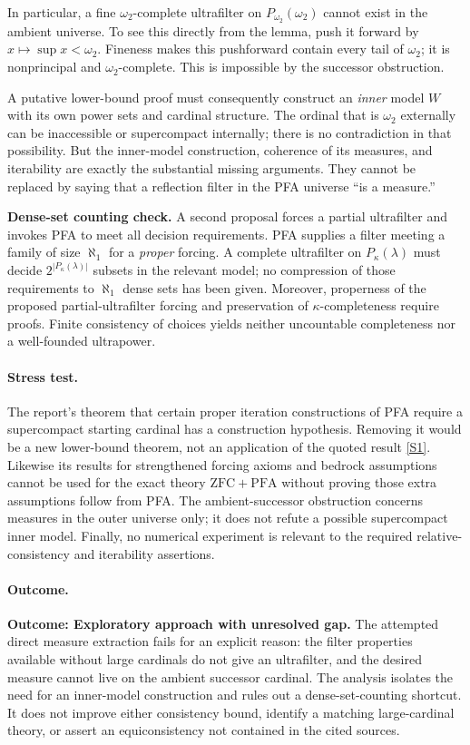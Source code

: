 \documentclass[11pt,a4paper]{article}
\newcommand{\sref}[2]{\hyperlink{source:#1:#2}{[S#2]}}
\numberwithin{equation}{section}
\begin{document}
In particular, a fine $\omega_2$-complete ultrafilter on $P_{\omega_2}(\omega_2)$ cannot exist in the ambient universe. To see this directly from the lemma, push it forward by $x\mapsto\sup x<\omega_2$. Fineness makes this pushforward contain every tail of $\omega_2$; it is nonprincipal and $\omega_2$-complete. This is impossible by the successor obstruction.

A putative lower-bound proof must consequently construct an \emph{inner} model $W$ with its own power sets and cardinal structure. The ordinal that is $\omega_2$ externally can be inaccessible or supercompact internally; there is no contradiction in that possibility. But the inner-model construction, coherence of its measures, and iterability are exactly the substantial missing arguments. They cannot be replaced by saying that a reflection filter in the PFA universe ``is a measure.''

\textbf{Dense-set counting check.} A second proposal forces a partial ultrafilter and invokes PFA to meet all decision requirements. PFA supplies a filter meeting a family of size $\aleph_1$ for a \emph{proper} forcing. A complete ultrafilter on $P_\kappa(\lambda)$ must decide $2^{|P_\kappa(\lambda)|}$ subsets in the relevant model; no compression of those requirements to $\aleph_1$ dense sets has been given. Moreover, properness of the proposed partial-ultrafilter forcing and preservation of $\kappa$-completeness require proofs. Finite consistency of choices yields neither uncountable completeness nor a well-founded ultrapower.

\paragraph{Stress test.}
The report's theorem that certain proper iteration constructions of PFA require a supercompact starting cardinal has a construction hypothesis. Removing it would be a new lower-bound theorem, not an application of the quoted result \sref{statement}{1}. Likewise its results for strengthened forcing axioms and bedrock assumptions cannot be used for the exact theory $\mathrm{ZFC}+\mathrm{PFA}$ without proving those extra assumptions follow from PFA. The ambient-successor obstruction concerns measures in the outer universe only; it does not refute a possible supercompact inner model. Finally, no numerical experiment is relevant to the required relative-consistency and iterability assertions.

\paragraph{Outcome.}
\textbf{Outcome: Exploratory approach with unresolved gap.}
The attempted direct measure extraction fails for an explicit reason: the filter properties available without large cardinals do not give an ultrafilter, and the desired measure cannot live on the ambient successor cardinal. The analysis isolates the need for an inner-model construction and rules out a dense-set-counting shortcut. It does not improve either consistency bound, identify a matching large-cardinal theory, or assert an equiconsistency not contained in the cited sources.
\end{document}
